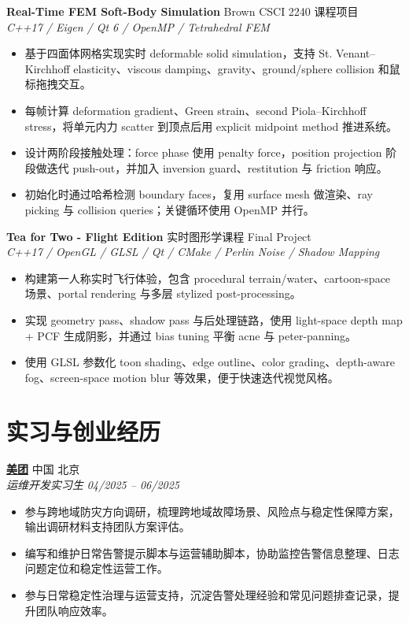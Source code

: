 \documentclass[10pt,fontset=none]{ctexart}
\newcommand{\entry}[4]{
  \textbf{#1} \hfill #2\\
  \textit{#3} \hfill \textit{#4}
}
\newcommand{\project}[3]{
  \textbf{#1} \hfill #2\\
  \textit{#3}
}
\begin{document}
\project{Real-Time FEM Soft-Body Simulation}{Brown CSCI 2240 课程项目}{C++17 / Eigen / Qt 6 / OpenMP / Tetrahedral FEM}
\begin{itemize}
  \item 基于四面体网格实现实时 deformable solid simulation，支持 St. Venant--Kirchhoff elasticity、viscous damping、gravity、ground/sphere collision 和鼠标拖拽交互。
  \item 每帧计算 deformation gradient、Green strain、second Piola--Kirchhoff stress，将单元内力 scatter 到顶点后用 explicit midpoint method 推进系统。
  \item 设计两阶段接触处理：force phase 使用 penalty force，position projection 阶段做迭代 push-out，并加入 inversion guard、restitution 与 friction 响应。
  \item 初始化时通过哈希检测 boundary faces，复用 surface mesh 做渲染、ray picking 与 collision queries；关键循环使用 OpenMP 并行。
\end{itemize}

\project{Tea for Two - Flight Edition}{实时图形学课程 Final Project}{C++17 / OpenGL / GLSL / Qt / CMake / Perlin Noise / Shadow Mapping}
\begin{itemize}
  \item 构建第一人称实时飞行体验，包含 procedural terrain/water、cartoon-space 场景、portal rendering 与多层 stylized post-processing。
  \item 实现 geometry pass、shadow pass 与后处理链路，使用 light-space depth map + PCF 生成阴影，并通过 bias tuning 平衡 acne 与 peter-panning。
  \item 使用 GLSL 参数化 toon shading、edge outline、color grading、depth-aware fog、screen-space motion blur 等效果，便于快速迭代视觉风格。
\end{itemize}

\section*{实习与创业经历}

\entry{\href{https://www.meituan.com/}{美团}}{中国 北京}{运维开发实习生}{04/2025 -- 06/2025}
\begin{itemize}
  \item 参与跨地域防灾方向调研，梳理跨地域故障场景、风险点与稳定性保障方案，输出调研材料支持团队方案评估。
  \item 编写和维护日常告警提示脚本与运营辅助脚本，协助监控告警信息整理、日志问题定位和稳定性运营工作。
  \item 参与日常稳定性治理与运营支持，沉淀告警处理经验和常见问题排查记录，提升团队响应效率。
\end{itemize}
\end{document}

